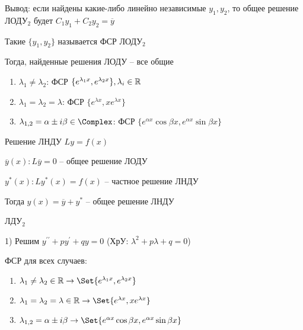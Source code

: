 \documentclass[12pt]{article}
\begin{document}
    \Nota Вывод: если найдены какие-либо линейно независимые $y_1, y_2$, то общее решение ЛОДУ$_2$ будет $C_1 y_1 + C_2 y_2 = \overline{y}$

    \Def Такие $\{y_1, y_2\}$ называется ФСР ЛОДУ$_2$

    \Nota Тогда, найденные решения ЛОДУ -- все общие

    \begin{enumerate}
        \item $\lambda_1 \neq \lambda_2$: ФСР $\{e^{\lambda_1 x}, e^{\lambda_2 x}\}, \lambda_i \in \mathbb{R}$

        \item $\lambda_1 = \lambda_2 = \lambda$: ФСР $\{e^{\lambda x}, x e^{\lambda x}\}$

        \item $\lambda_{1,2} = \alpha \pm i \beta \in \mathbb{\Complex}$: ФСР $\{e^{\alpha x} \cos\beta x, e^{\alpha x} \sin \beta x\}$
    \end{enumerate}

    \begin{MyTheorem}
         Решение ЛНДУ $Ly = f(x)$

        $\overline{y}(x): L\overline{y} = 0$ -- общее решение ЛОДУ

        $y^*(x): Ly^*(x) = f(x)$ -- частное решение ЛНДУ

        Тогда $y(x) = \overline{y} + y^*$ -- общее решение ЛНДУ
    \end{MyTheorem}

    \begin{MyProof} \Lab \end{MyProof}


    \Mem ЛДУ$_2$

    1) Решим $y^{\prime\prime} + py^\prime + qy = 0$ (ХрУ: $\lambda^2 + p \lambda + q = 0$)

    ФСР для всех случаев:

    \begin{enumerate}
        \item $\lambda_1 \neq \lambda_2 \in \Real \to \Set{e^{\lambda_1 x}, e^{\lambda_2 x}}$

        \item $\lambda_1 = \lambda_2 = \lambda \in \Real \to \Set{e^{\lambda x}, xe^{\lambda x}}$

        \item $\lambda_{1,2} = \alpha \pm i \beta \to \Set{e^{\alpha x} \cos \beta x, e^{\alpha x} \sin \beta x}$
    \end{enumerate}
\end{document}
